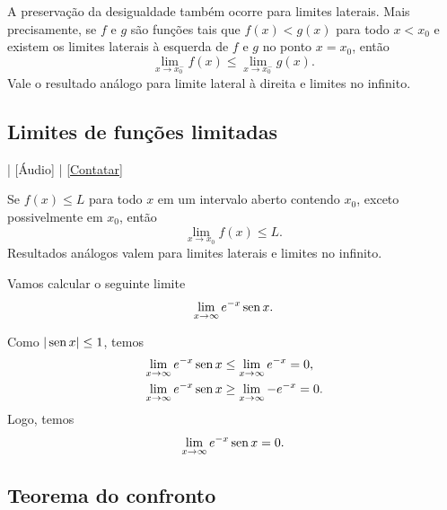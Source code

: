 \begin{obs}
  A preservação da desigualdade também ocorre para limites laterais. Mais precisamente, se $f$ e $g$ são funções tais que $f(x)<g(x)$ para todo $x < x_0$ e existem os limites laterais à esquerda de $f$ e $g$ no ponto $x=x_0$, então
  \begin{equation}
    \lim_{x\to x_0^-} f(x) \leq \lim_{x\to x_0^-} g(x).
  \end{equation}
  Vale o resultado análogo para limite lateral à direita e limites no infinito.
\end{obs}

\subsection{Limites de funções limitadas}

\begin{flushright}
  [Vídeo] | [Áudio] | \href{https://phkonzen.github.io/notas/contato.html}{[Contatar]}
\end{flushright}

Se $f(x) \leq L$ para todo $x$ em um intervalo aberto contendo $x_0$, exceto possivelmente em $x_0$, então
\begin{equation}
  \lim_{x\to x_0} f(x) \leq L.
\end{equation}
Resultados análogos valem para limites laterais e limites no infinito.

\begin{ex}
  Vamos calcular o seguinte limite
  \begin{equation}
    \lim_{x\to \infty} e^{-x}\operatorname{sen} x.
  \end{equation}

  
  
  Como $|\operatorname{sen} x| \leq 1$, temos
  \begin{align}
    & \lim_{x\to \infty} e^{-x}\operatorname{sen} x \leq \lim_{x\to \infty} e^{-x} = 0,\\
    & \lim_{x\to \infty} e^{-x}\operatorname{sen} x \geq \lim_{x\to \infty} -e^{-x} = 0.
  \end{align}
  Logo, temos
  \begin{equation}
    \lim_{x\to \infty} e^{-x}\operatorname{sen} x = 0.
  \end{equation}
\end{ex}


\subsection{Teorema do confronto}

